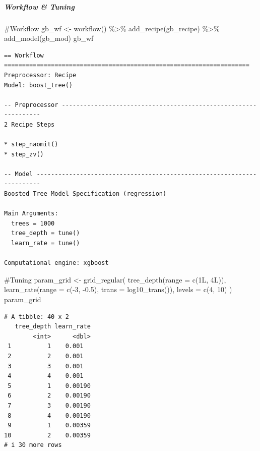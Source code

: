 \documentclass[
]{article}
\let\oldsubparagraph\subparagraph
\renewcommand{\subparagraph}[1]{\oldsubparagraph{#1}\mbox{}}
\newenvironment{Shaded}{\begin{snugshade}}{\end{snugshade}}
\newcommand{\AttributeTok}[1]{\textcolor[rgb]{0.40,0.45,0.13}{#1}}
\newcommand{\CommentTok}[1]{\textcolor[rgb]{0.37,0.37,0.37}{#1}}
\newcommand{\DecValTok}[1]{\textcolor[rgb]{0.68,0.00,0.00}{#1}}
\newcommand{\FloatTok}[1]{\textcolor[rgb]{0.68,0.00,0.00}{#1}}
\newcommand{\FunctionTok}[1]{\textcolor[rgb]{0.28,0.35,0.67}{#1}}
\newcommand{\NormalTok}[1]{\textcolor[rgb]{0.00,0.23,0.31}{#1}}
\newcommand{\OtherTok}[1]{\textcolor[rgb]{0.00,0.23,0.31}{#1}}
\newcommand{\SpecialCharTok}[1]{\textcolor[rgb]{0.37,0.37,0.37}{#1}}
\begin{document}
\hypertarget{workflow-tuning}{%
\subparagraph{Workflow \& Tuning}\label{workflow-tuning}}

\begin{Shaded}
\begin{Highlighting}[]
\CommentTok{\#Workflow}
\NormalTok{gb\_wf }\OtherTok{\textless{}{-}} \FunctionTok{workflow}\NormalTok{() }\SpecialCharTok{\%\textgreater{}\%}
  \FunctionTok{add\_recipe}\NormalTok{(gb\_recipe) }\SpecialCharTok{\%\textgreater{}\%}
  \FunctionTok{add\_model}\NormalTok{(gb\_mod)}
\NormalTok{gb\_wf}
\end{Highlighting}
\end{Shaded}

\begin{verbatim}
== Workflow ====================================================================
Preprocessor: Recipe
Model: boost_tree()

-- Preprocessor ----------------------------------------------------------------
2 Recipe Steps

* step_naomit()
* step_zv()

-- Model -----------------------------------------------------------------------
Boosted Tree Model Specification (regression)

Main Arguments:
  trees = 1000
  tree_depth = tune()
  learn_rate = tune()

Computational engine: xgboost 
\end{verbatim}

\begin{Shaded}
\begin{Highlighting}[]
\CommentTok{\#Tuning}
\NormalTok{param\_grid }\OtherTok{\textless{}{-}} \FunctionTok{grid\_regular}\NormalTok{(}
  \FunctionTok{tree\_depth}\NormalTok{(}\AttributeTok{range =} \FunctionTok{c}\NormalTok{(1L, 4L)),}
  \FunctionTok{learn\_rate}\NormalTok{(}\AttributeTok{range =} \FunctionTok{c}\NormalTok{(}\SpecialCharTok{{-}}\DecValTok{3}\NormalTok{, }\SpecialCharTok{{-}}\FloatTok{0.5}\NormalTok{), }\AttributeTok{trans =} \FunctionTok{log10\_trans}\NormalTok{()),}
  \AttributeTok{levels =} \FunctionTok{c}\NormalTok{(}\DecValTok{4}\NormalTok{, }\DecValTok{10}\NormalTok{)}
\NormalTok{  )}
\NormalTok{param\_grid}
\end{Highlighting}
\end{Shaded}

\begin{verbatim}
# A tibble: 40 x 2
   tree_depth learn_rate
        <int>      <dbl>
 1          1    0.001  
 2          2    0.001  
 3          3    0.001  
 4          4    0.001  
 5          1    0.00190
 6          2    0.00190
 7          3    0.00190
 8          4    0.00190
 9          1    0.00359
10          2    0.00359
# i 30 more rows
\end{verbatim}
\end{document}
